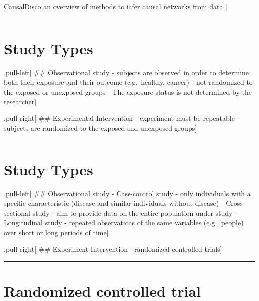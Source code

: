 \documentclass[]{article}
\begin{document}
\href{https://github.com/annennenne/causalDisco/blob/master/slides/causaldisco_ahp_user2019.pdf}{CausalDisco}
an overview of methods to infer causal networks from data {]}

\begin{center}\rule{0.5\linewidth}{\linethickness}\end{center}

\hypertarget{study-types}{%
\section{Study Types}\label{study-types}}

.pull-left{[} \#\# Observational study - subjects are observed in order
to determine both their exposure and their outcome (e.g.~healthy,
cancer) - not randomized to the exposed or unexposed groups - The
exposure status is not determined by the researcher{]}

.pull-right{[} \#\# Experimental Intervention - experiment must be
repeatable - subjects are randomized to the exposed and unexposed
groups{]}

\begin{center}\rule{0.5\linewidth}{\linethickness}\end{center}

\hypertarget{study-types-1}{%
\section{Study Types}\label{study-types-1}}

.pull-left{[} \#\# Observational study - Case-control study - only
individuals with a specific characteristic (disease and similar
individuals without disease) - Cross-sectional study - aim to provide
data on the entire population under study - Longitudinal study -
repeated observations of the same variables (e.g., people) over short or
long periods of time{]}

.pull-right{[} \#\# Experiment Intervention - randomized controlled
trials{]}

\begin{center}\rule{0.5\linewidth}{\linethickness}\end{center}

\hypertarget{randomized-controlled-trial}{%
\section{Randomized controlled
trial}\label{randomized-controlled-trial}}
\end{document}
